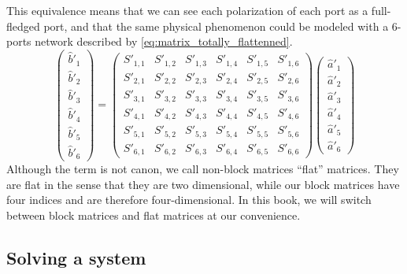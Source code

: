 This equivalence means that we can see each polarization of each port as a full-fledged port, and that the same physical phenomenon could be modeled with a 6-ports network described by \cref{eq:matrix_totally_flattenned}.
\begin{equation}
    \begin{pmatrix}
        \hat{b}'_1 \\ \hat{b}'_2 \\ \hat{b}'_3 \\ \hat{b}'_{4} \\ \hat{b}'_{5} \\ \hat{b}'_{6}
    \end{pmatrix}
    =
    \begin{pmatrix}
        S'_{1, 1} & S'_{1, 2} & S'_{1, 3} & S'_{1, 4} & S'_{1, 5} & S'_{1, 6} \\
        S'_{2, 1} & S'_{2, 2} & S'_{2, 3} & S'_{2, 4} & S'_{2, 5} & S'_{2, 6} \\
        S'_{3, 1} & S'_{3, 2} & S'_{3, 3} & S'_{3, 4} & S'_{3, 5} & S'_{3, 6} \\
        S'_{4, 1} & S'_{4, 2} & S'_{4, 3} & S'_{4, 4} & S'_{4, 5} & S'_{4, 6} \\
        S'_{5, 1} & S'_{5, 2} & S'_{5, 3} & S'_{5, 4} & S'_{5, 5} & S'_{5, 6} \\
        S'_{6, 1} & S'_{6, 2} & S'_{6, 3} & S'_{6, 4} & S'_{6, 5} & S'_{6, 6}
    \end{pmatrix}
    \begin{pmatrix}
        \hat{a}'_1 \\ \hat{a}'_2 \\ \hat{a}'_3 \\ \hat{a}'_{4} \\ \hat{a}'_{5} \\ \hat{a}'_{6}
    \end{pmatrix}
    \label{eq:matrix_totally_flattenned}
\end{equation}
Although the term is not canon, we call non-block matrices ``flat'' matrices.
They are flat in the sense that they are two dimensional, while our block matrices have four indices and are therefore four-dimensional.
In this book, we will switch between block matrices and flat matrices at our convenience.




\subsection{Solving a system}
\label{sec:solving_a_system}



